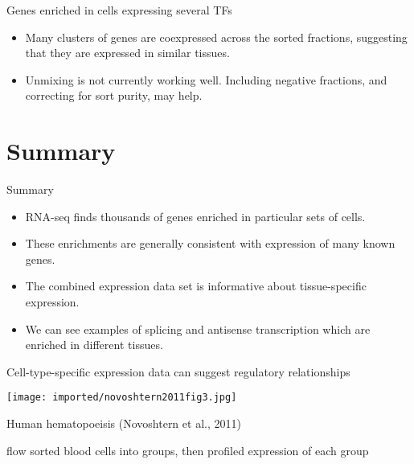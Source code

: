 \documentclass[serif,9pt]{beamer}
\begin{document}
\begin{frame}{Genes enriched in cells expressing several TFs}

\begin{itemize}

\item Many clusters of genes are coexpressed across the sorted fractions,
suggesting that they are expressed in similar tissues.

\item Unmixing is not currently working well. Including negative fractions,
and correcting for sort purity, may help.

\end{itemize}

\end{frame}

\section{Summary}

\begin{frame}{Summary}

\begin{itemize}

\item RNA-seq finds thousands of genes enriched in particular sets
of cells.
\pause

\item These enrichments are generally consistent with
expression of many known genes.
\pause

\item The combined expression data
set is informative about tissue-specific expression.
\pause

\item We can see examples of splicing and antisense transcription
which are enriched in different tissues.

\end{itemize}

\end{frame}

\begin{frame}{Cell-type-specific expression data can suggest regulatory relationships}

\texttt{[image: imported/novoshtern2011fig3.jpg]}

Human hematopoeisis (Novoshtern et al., 2011)

{\small flow sorted blood cells into groups, then profiled expression of each group}

\end{frame}
\end{document}
